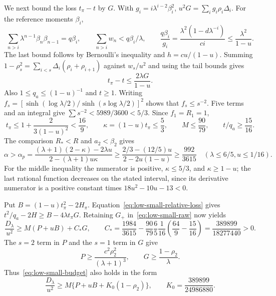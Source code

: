 We next bound the loss $t_\pi-t$ by $G$.  With
$g_i=i\lambda^{i-2}\beta_i^2$,
$u^2G=\sum_i g_i\rho_i\Delta_i$. For the reference moments $\beta_i$,
\[
 \sum_{n>i}\lambda^{n-1}\beta_n\beta_{n-1}=q\beta_i,
 \qquad \sum_{n>i}w_n<q\beta_i/\lambda,
 \qquad \frac{q\beta_i}{g_i}
 =\frac{\lambda^2(1-d\lambda^{-i})}{ci}
 \le\frac{\lambda^2}{1-u}.
\]
The last bound follows by Bernoulli's inequality and
$h=cu/(1-u)$. Summing $1-\rho_s^2=\sum_{i<s}\Delta_i(\rho_i+\rho_{i+1})$
against $w_s/u^2$ and using the tail bounds gives
\begin{equation}\label{eq:low-small-relative-loss}
 t_\pi-t\le\frac{2\lambda G}{1-u}.
\end{equation}
Also $1\le q_a\le(1-u)^{-1}$ and $t\ge1$.
Writing $f_s=[\sinh(\log\lambda/2)/\sinh(s\log\lambda/2)]^2$
shows that $f_s\le s^{-2}$.  Five terms and an integral give
$\sum s^{-2}<5989/3600<5/3$.  Since $f_1=R_1=1$,
\[
 t_\pi\le1+\frac{2}{3(1-u)^2}<\frac{16}9,\qquad
 \kappa=(1-u)t_\pi\le\frac53,\qquad
 M\le\frac{90}{79},\qquad t/q_a\ge\frac{15}{16}.
\]
The comparison $R_*<R$ and $a_2<\beta_2$ gives
\[
 \alpha>\alpha_p
 =\frac{(\lambda+1)(2-\kappa)-2\lambda u}
              {2-(\lambda+1)u\kappa}
 \ge\frac{2/3-(12/5)u}{2-2u(1-u)}\ge\frac{992}{3615}
 \quad(\lambda\le6/5, u\le1/16).
\]
For the middle inequality the numerator is positive, $\kappa\le5/3$,
and $\kappa\ge1-u$; the last rational function decreases on the
stated interval, since its derivative numerator is a positive constant
times $18u^2-10u-13<0$.

Put $B=(1-u)t_\pi^2-2H_\pi$.
Equation~\eqref{eq:low-small-relative-loss} gives
$t^2/q_a-2H\ge B-4\lambda t_\pi G$.
Retaining $G_+$ in~\eqref{eq:low-small-raw} now yields
\begin{equation}\label{eq:low-small-budget}
 \frac{D_\lambda}{u^2}\ge M(P+uB)+C_*G,\qquad
 C_* =\frac{1984}{3615}
 -\frac{90}{79}\frac65\frac1{16}
       \left(\frac{64}{9}-\frac{15}{16}\right)
 =\frac{389899}{18277440}>0.
\end{equation}
The $s=2$ term in $P$ and the $s=1$ term in $G$ give
\[
 P\ge\frac{c^2\rho_2^2}{(\lambda+1)^3},\qquad
 G\ge\frac{1-\rho_2}\lambda.
\]
Thus~\eqref{eq:low-small-budget} also holds in the form
\begin{equation}\label{eq:low-small-root-budget}
 \frac{D_\lambda}{u^2}\ge
 M\{P+uB+K_0(1-\rho_2)\},\qquad
 K_0=\frac{389899}{24986880}.
\end{equation}

